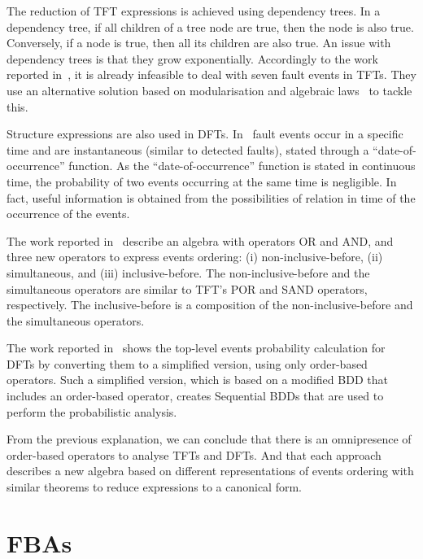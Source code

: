 \documentclass[en,twoside,onehalfspacing,phd]{risethesis}
\begin{document}
The reduction of \ac{TFT} expressions is achieved using dependency trees.
In a dependency tree, if all children of a tree node are true, then the node is also true.
Conversely, if a node is true, then all its children are also true.
An issue with dependency trees is that they grow exponentially.
Accordingly to the work reported in~\cite{WP2010}, it is already infeasible to deal with seven fault events in TFTs.
They use an alternative solution based on modularisation and algebraic laws~\cite{WP2009} to tackle this.

Structure expressions are also used in \acp{DFT}.
In~\cite{Merle2010,MRL+2010,MRL2011} fault events occur in a specific time and are instantaneous (similar to detected faults), stated through a ``date-of-occurrence'' function.
As the ``date-of-occurrence'' function is stated in continuous time, the probability of two events occurring at the same time is negligible.
In fact, useful information is obtained from the possibilities of relation in time of the occurrence of the events.

The work reported in~\cite{Merle2010,MRL+2010,MRL2011} describe an algebra with operators OR and AND, and three new operators to express events ordering: (i) non-inclusive-before, (ii) simultaneous, and (iii) inclusive-before.
The non-inclusive-before and the simultaneous operators are similar to \ac{TFT}'s POR and SAND operators, respectively.
The inclusive-before is a composition of the non-inclusive-before and the simultaneous operators.

The work reported in~\cite{TXD2011,XTD2012} shows the top-level events probability calculation for \acp{DFT} by converting them to a simplified version, using only order-based operators.
Such a simplified version, which is based on a modified \ac{BDD} that includes an order-based operator, creates Sequential BDDs that are used to perform the probabilistic analysis.

From the previous explanation, we can conclude that there is an omnipresence of order-based operators to analyse \acp{TFT} and \acp{DFT}.
And that each approach describes a new algebra based on different representations of events ordering with similar theorems to reduce expressions to a canonical form.

\section[Free Boolean Algebras]{\Aclp*{FBA}}
\label{sec:fba}
\end{document}
